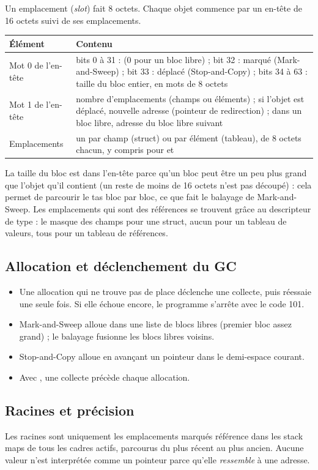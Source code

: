 \documentclass[11pt,a4paper]{article}
\newcommand{\code}[1]{\texttt{\detokenize{#1}}}
\begin{document}
Un emplacement (\emph{slot}) fait 8 octets. Chaque objet commence par un en-tête de 16 octets suivi de ses emplacements.

\begin{longtable}{@{}p{} p{}@{}}
\toprule
\textbf{Élément} & \textbf{Contenu} \\
\midrule
\endhead
Mot 0 de l'en-tête & bits 0 à 31 : \code{type_id} (0 pour un bloc libre) ; bit 32 : marqué (Mark-and-Sweep) ; bit 33 : déplacé (Stop-and-Copy) ; bits 34 à 63 : taille du bloc entier, en mots de 8 octets \\
Mot 1 de l'en-tête & nombre d'emplacements (champs ou éléments) ; si l'objet est déplacé, nouvelle adresse (pointeur de redirection) ; dans un bloc libre, adresse du bloc libre suivant \\
Emplacements & un par champ (struct) ou par élément (tableau), de 8 octets chacun, y compris pour \code{int} et \code{bool} \\
\bottomrule
\end{longtable}

La taille du bloc est dans l'en-tête parce qu'un bloc peut être un peu plus grand que l'objet qu'il contient (un reste de moins de 16 octets n'est pas découpé) : cela permet de parcourir le tas bloc par bloc, ce que fait le balayage de Mark-and-Sweep. Les emplacements qui sont des références se trouvent grâce au descripteur de type : le masque des champs pour une struct, \og aucun \fg{} pour un tableau de valeurs, \og tous \fg{} pour un tableau de références.

\subsection{Allocation et déclenchement du GC}
\begin{itemize}
  \item Une allocation qui ne trouve pas de place déclenche une collecte, puis réessaie une seule fois. Si elle échoue encore, le programme s'arrête avec le code 101.
  \item Mark-and-Sweep alloue dans une liste de blocs libres (premier bloc assez grand) ; le balayage fusionne les blocs libres voisins.
  \item Stop-and-Copy alloue en avançant un pointeur dans le demi-espace courant.
  \item Avec \code{--stress}, une collecte précède chaque allocation.
\end{itemize}

\subsection{Racines et précision}
Les racines sont uniquement les emplacements marqués \og référence \fg{} dans les stack maps de tous les cadres actifs, parcourus du plus récent au plus ancien. Aucune valeur n'est interprétée comme un pointeur parce qu'elle \emph{ressemble} à une adresse.
\end{document}

